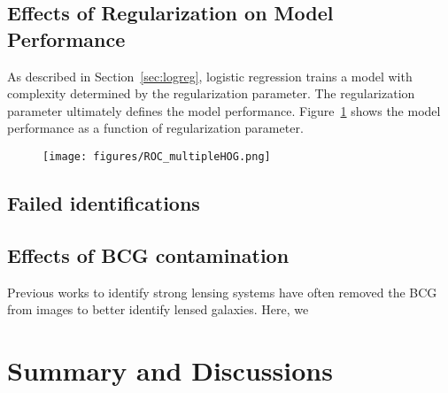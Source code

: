 \documentclass{emulateapj}
\begin{document}
\subsection{Effects of Regularization on Model Performance}\label{sec:regularizedfit}

As described in Section~\ref{sec:logreg}, logistic regression trains a
model with complexity determined by the regularization parameter.  The
regularization parameter ultimately defines the model performance.
Figure~\ref{fig:regularization} shows the model performance as a function of
regularization parameter. 

\begin{figure}[t]\label{fig:regularization}
\begin{center}
\texttt{[image: figures/ROC\_multipleHOG.png]}
\caption{}
\end{center}
\end{figure}


\subsection{Failed identifications}\label{sec:failedids}



\subsection{Effects of BCG contamination}

Previous works to identify strong lensing systems have often removed
the BCG from images to better identify lensed galaxies.  Here, we

\section{Summary and Discussions}
\label{sec:conclusions}
\end{document}
